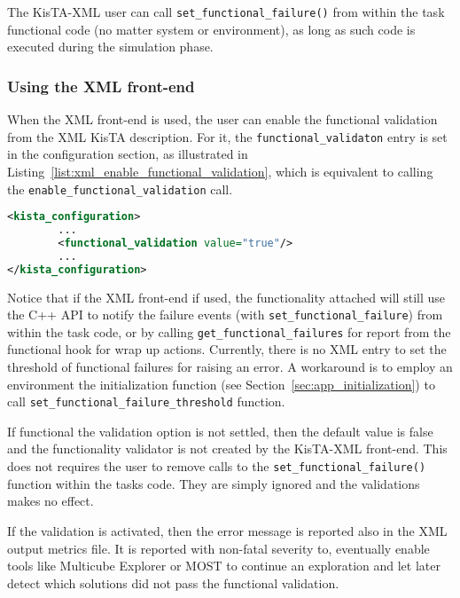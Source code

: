 The KisTA-XML user can call \texttt{set\_functional\_failure()} from within the task functional code (no matter system or environment), as long as such code is executed during the simulation phase.

\subsubsection{Using the XML front-end}
\label{sec:app_initialization_xml}

When the XML front-end is used, the user can enable the functional validation from the XML KisTA description.
For it, the \texttt{functional\_validaton} entry is set in the configuration section,
as illustrated in Listing~\ref{list:xml_enable_functional_validation},
which is equivalent to calling the \texttt{enable\_functional\_validation} call.

\begin{lstlisting}[language=XML, caption={Enabling functional validation from the XML description.}, label=list:xml_enable_functional_validation]
<kista_configuration>
        ...
        <functional_validation value="true"/>
        ...
</kista_configuration>
\end{lstlisting}

%
Notice that if the XML front-end if used, the functionality attached will still use the C++ API to notify the failure events (with \texttt{set\_functional\_failure})
from within the task code, or by calling \texttt{get\_functional\_failures} for report from the functional hook for wrap up actions.
%
Currently, there is no XML entry to set the threshold of functional failures for raising an error.
A workaround is to employ an environment the initialization function (see Section~\ref{sec:app_initialization}) to call \texttt{set\_functional\_failure\_threshold} function.

If functional the validation option is not settled, then the default value is false and the functionality validator is not created by the KisTA-XML front-end.
This does not requires the user to remove calls to the \texttt{set\_functional\_failure()} function within the tasks code. They are simply ignored and the validations makes no effect.

If the validation is activated, then the error message is reported also in the XML output metrics file.
It is reported with non-fatal severity to, eventually enable tools like Multicube Explorer or MOST to continue an exploration and let later detect which solutions did not pass the functional validation.